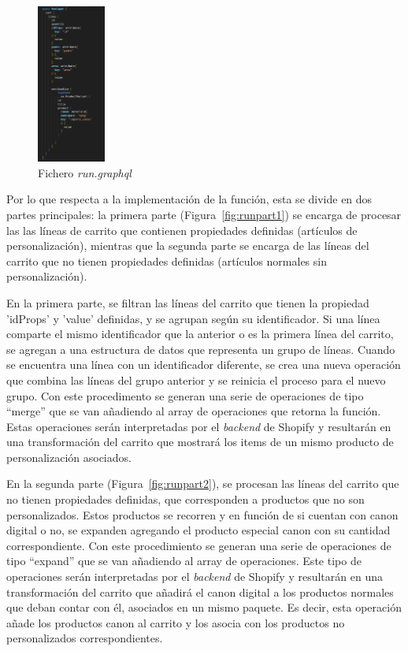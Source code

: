 \documentclass[12pt]{article}
\begin{document}
\begin{figure}[ht]
    \centering
    \includegraphics[width=0.2\textwidth]{imagenes-tema/queryCartTransform.png}
    \caption{\label{fig:queryCart} Fichero \textit{run.graphql}}
    \vspace{\fill}
\end{figure}

Por lo que respecta a la implementación de la función, esta se divide en dos partes principales: la primera parte (Figura~\ref{fig:runpart1})  se encarga de procesar las las líneas de carrito que contienen
propiedades definidas (artículos de personalización), mientras que la segunda parte se encarga de las líneas del carrito que no tienen propiedades definidas (artículos normales sin personalización).

En la primera parte, se filtran las líneas del carrito que tienen la propiedad 'idProps' y 'value' definidas, y se agrupan según su identificador. Si una línea comparte el mismo identificador que la anterior
o es la primera línea del carrito, se agregan a una estructura de datos que representa un grupo de líneas. Cuando se encuentra una línea con un identificador diferente, se crea una nueva operación 
que combina las líneas del grupo anterior y se reinicia el proceso para el nuevo grupo. Con este procedimento se generan una serie de operaciones de tipo ``merge'' que se van añadiendo al array de operaciones que retorna 
la función. Estas operaciones serán interpretadas por el \textit{backend} de Shopify y resultarán en una transformación del carrito que mostrará los items de un mismo producto de personalización asociados.

En la segunda parte (Figura~\ref{fig:runpart2}), se procesan las líneas del carrito que no tienen propiedades definidas, que corresponden a productos que no son personalizados. Estos productos se recorren y en función de si cuentan con canon digital o no, se expanden agregando 
el producto especial canon con su cantidad correspondiente. Con este procedimiento se generan una serie de operaciones de tipo ``expand'' que se van añadiendo al array de operaciones. Este tipo de operaciones
serán interpretadas por el \textit{backend} de Shopify y resultarán en una transformación del carrito que añadirá el canon digital a los productos normales que deban contar con él, asociados en un mismo paquete. Es decir, esta operación añade los productos canon al carrito
y los asocia con los productos no personalizados correspondientes.
\end{document}
